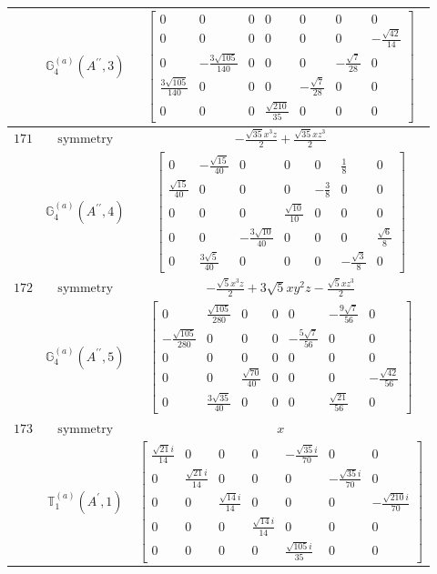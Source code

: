 \documentclass[fleqn,8pt,landscape]{jsarticle}
\begin{document}
\begin{longtable}{ccc}
$  $ & $ \mathbb{G}_{4}^{(a)}(A^{\prime\prime},3) $ & $ \begin{bmatrix} 0 & 0 & 0 & 0 & 0 & 0 & 0 \\ 0 & 0 & 0 & 0 & 0 & 0 & - \frac{\sqrt{42}}{14} \\ 0 & - \frac{3 \sqrt{105}}{140} & 0 & 0 & 0 & - \frac{\sqrt{7}}{28} & 0 \\ \frac{3 \sqrt{105}}{140} & 0 & 0 & 0 & - \frac{\sqrt{7}}{28} & 0 & 0 \\ 0 & 0 & 0 & \frac{\sqrt{210}}{35} & 0 & 0 & 0 \end{bmatrix} $ \\ \hline
$ 171 $ & $ \text{symmetry} $ & $ - \frac{\sqrt{35} x^{3} z}{2} + \frac{\sqrt{35} x z^{3}}{2} $ \\
$  $ & $ \mathbb{G}_{4}^{(a)}(A^{\prime\prime},4) $ & $ \begin{bmatrix} 0 & - \frac{\sqrt{15}}{40} & 0 & 0 & 0 & \frac{1}{8} & 0 \\ \frac{\sqrt{15}}{40} & 0 & 0 & 0 & - \frac{3}{8} & 0 & 0 \\ 0 & 0 & 0 & \frac{\sqrt{10}}{10} & 0 & 0 & 0 \\ 0 & 0 & - \frac{3 \sqrt{10}}{40} & 0 & 0 & 0 & \frac{\sqrt{6}}{8} \\ 0 & \frac{3 \sqrt{5}}{40} & 0 & 0 & 0 & - \frac{\sqrt{3}}{8} & 0 \end{bmatrix} $ \\ \hline
$ 172 $ & $ \text{symmetry} $ & $ - \frac{\sqrt{5} x^{3} z}{2} + 3 \sqrt{5} x y^{2} z - \frac{\sqrt{5} x z^{3}}{2} $ \\
$  $ & $ \mathbb{G}_{4}^{(a)}(A^{\prime\prime},5) $ & $ \begin{bmatrix} 0 & \frac{\sqrt{105}}{280} & 0 & 0 & 0 & - \frac{9 \sqrt{7}}{56} & 0 \\ - \frac{\sqrt{105}}{280} & 0 & 0 & 0 & - \frac{5 \sqrt{7}}{56} & 0 & 0 \\ 0 & 0 & 0 & 0 & 0 & 0 & 0 \\ 0 & 0 & \frac{\sqrt{70}}{40} & 0 & 0 & 0 & - \frac{\sqrt{42}}{56} \\ 0 & \frac{3 \sqrt{35}}{40} & 0 & 0 & 0 & \frac{\sqrt{21}}{56} & 0 \end{bmatrix} $ \\ \hline
$ 173 $ & $ \text{symmetry} $ & $ x $ \\
$  $ & $ \mathbb{T}_{1}^{(a)}(A^{\prime},1) $ & $ \begin{bmatrix} \frac{\sqrt{21} i}{14} & 0 & 0 & 0 & - \frac{\sqrt{35} i}{70} & 0 & 0 \\ 0 & \frac{\sqrt{21} i}{14} & 0 & 0 & 0 & - \frac{\sqrt{35} i}{70} & 0 \\ 0 & 0 & \frac{\sqrt{14} i}{14} & 0 & 0 & 0 & - \frac{\sqrt{210} i}{70} \\ 0 & 0 & 0 & \frac{\sqrt{14} i}{14} & 0 & 0 & 0 \\ 0 & 0 & 0 & 0 & \frac{\sqrt{105} i}{35} & 0 & 0 \end{bmatrix} $ \\ \hline

\end{longtable}
\end{document}

